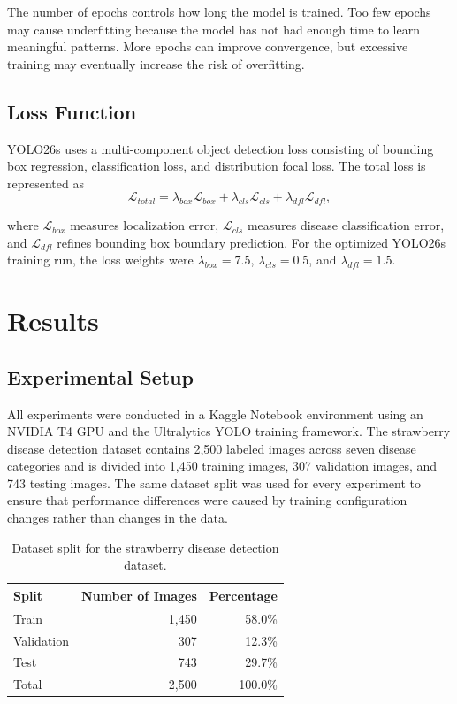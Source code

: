\documentclass[10pt,twocolumn,letterpaper]{article}
\begin{document}
The number of epochs controls how long the model is trained. Too few epochs may cause underfitting because the model has not had enough time to learn meaningful patterns. More epochs can improve convergence, but excessive training may eventually increase the risk of overfitting.

\subsection{Loss Function}

YOLO26s uses a multi-component object detection loss consisting of bounding box regression, classification loss, and distribution focal loss. The total loss is represented as
\begin{equation}
\mathcal{L}_{total} =
\lambda_{box}\mathcal{L}_{box}
+ \lambda_{cls}\mathcal{L}_{cls}
+ \lambda_{dfl}\mathcal{L}_{dfl},
\end{equation}

where $\mathcal{L}_{box}$ measures localization error, $\mathcal{L}_{cls}$ measures disease classification error, and $\mathcal{L}_{dfl}$ refines bounding box boundary prediction. For the optimized YOLO26s training run, the loss weights were $\lambda_{box}=7.5$, $\lambda_{cls}=0.5$, and $\lambda_{dfl}=1.5$.

\section{Results}
\label{sec:results}

\subsection{Experimental Setup}

All experiments were conducted in a Kaggle Notebook environment using an NVIDIA T4 GPU and the Ultralytics YOLO training framework. The strawberry disease detection dataset contains 2,500 labeled images across seven disease categories and is divided into 1,450 training images, 307 validation images, and 743 testing images. The same dataset split was used for every experiment to ensure that performance differences were caused by training configuration changes rather than changes in the data.

\begin{table}[!htbp]
  \centering
  \begin{tabular}{@{}lrr@{}}
    \toprule
    Split & Number of Images & Percentage \\
    \midrule
    Train & 1,450 & 58.0\% \\
    Validation & 307 & 12.3\% \\
    Test & 743 & 29.7\% \\
    \midrule
    Total & 2,500 & 100.0\% \\
    \bottomrule
  \end{tabular}
  \caption{Dataset split for the strawberry disease detection dataset.}
  \label{tab:dataset_split}
\end{table}
\end{document}
